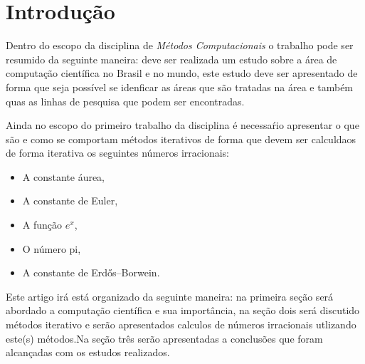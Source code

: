 \section*{Introdução}

	Dentro do escopo da disciplina de \emph{Métodos Computacionais} o trabalho
	pode ser resumido da seguinte maneira: deve ser realizada um estudo sobre a
	área de computação científica no Brasil e no mundo, este estudo deve ser
	apresentado de forma que seja possível se idenficar as áreas que são
	tratadas na área e também quas as linhas de pesquisa que podem ser
	encontradas.

	Ainda no escopo do primeiro trabalho da disciplina é necessaŕio apresentar o
	que são e como se comportam métodos iterativos de forma que devem ser
	calculdaos de forma iterativa os seguintes números irracionais:

	\begin{itemize}
		\item A constante áurea,
		\item A constante de Euler,
		\item A função $e^x$,
		\item O número pi,
		\item A constante de Erdős–Borwein.
	\end{itemize}

	Este artigo irá está organizado da seguinte maneira: na primeira seção será
	abordado a computação científica e sua importância, na seção dois será
	discutido métodos iterativo e serão apresentados calculos de números irracionais utlizando
	este(s) métodos.Na seção três serão apresentadas a conclusões que
	foram alcançadas com os estudos realizados.
